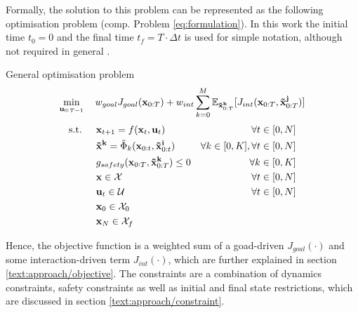 Formally, the solution to this problem can be represented as the following optimisation problem (comp. Problem \ref{eq:formulation}). In this work the initial time $t_0 = 0$ and the final time $t_f = T \cdot \Delta t$ is used for simple notation, although not required in general \cite{Wachter2006}. \\

\begin{problem} General \project optimisation problem
\begin{equation}
\min_{\u_{0:T-1}} \quad w_{goal} J_{goal}(\x_{0:T}) + w_{int} \sum_{k=0}^M \mathbb{E}_{\xped[k]_{0:T}}[J_{int}(\x_{0:T}, \xped[j]_{0:T})]
\end{equation}
\begin{align}
\textrm{s.t. } \quad & \x_{t+1} = f(\x_t, \u_t) & \forall t \in [0, N] \\
& \xped[k] = \tilde{\Phi}_k(\x_{0:t}, \xped[i]_{0:t}) & \forall k \in [0, K], \forall t \in [0, N]\\
& g_{safety}(\x_{0:T}, \xped[k]_{0:T}) \leq 0 & \forall k \in [0, K] \\
& \x \in \mathcal{X} & \forall t \in [0, N]\\
& \u_t \in \mathcal{U} & \forall t \in [0, N]\\
& \x_0 \in \mathcal{X}_0 \\
& \x_N \in \mathcal{X}_f
\end{align} 
\label{eq:formulation}
\end{problem}

Hence, the objective function is a weighted sum of a goad-driven $J_{goal}(\cdot)$ and some interaction-driven term $J_{int}(\cdot)$, which are further explained in section \ref{text:approach/objective}. The constraints are a combination of dynamics constraints, safety constraints as well as initial and final state restrictions, which are discussed in section \ref{text:approach/constraint}.


